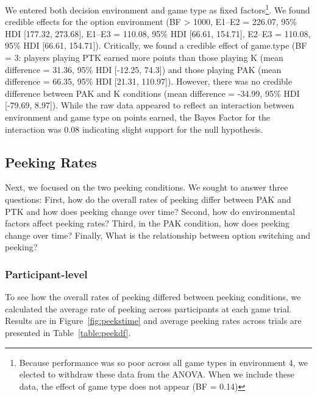 \documentclass[a4paper,doc,natbib,floatsintext]{apa6}\usepackage[]{graphicx}\usepackage[]{color}
\begin{document}
We entered both decision environment and game type as fixed factors\footnote{Because performance was so poor across all game types in environment 4, we elected to withdraw these data from the ANOVA. When we include these data, the effect of game type does not appear (BF = 0.14)}. We found credible effects for the option environment (BF > 1000, E1--E2 = 226.07, 95\% HDI [177.32, 273.68], E1--E3 = 110.08, 95\% HDI [66.61, 154.71], E2--E3 = 110.08, 95\% HDI [66.61, 154.71]). Critically, we found a credible effect of game.type (BF =  3: players playing PTK earned more points than those playing K (mean difference = 31.36, 95\% HDI [-12.25, 74.3]) and those playing PAK (mean difference = 66.35, 95\% HDI [21.31, 110.97]). However, there was no credible difference between PAK and K conditions (mean difference = -34.99, 95\% HDI [-79.69, 8.97]). While the raw data appeared to reflect an interaction between environment and game type on points earned, the Bayes Factor for the interaction was 0.08 indicating slight support for the null hypothesis.

\subsection{Peeking Rates}

Next, we focused on the two peeking conditions. We sought to answer three questions: First, how do the overall rates of peeking differ between PAK and PTK and how does peeking change over time? Second, how do environmental factors affect peeking rates? Third, in the PAK condition, how does peeking change over time? Finally, What is the relationship between option switching and peeking? 

\subsubsection{Participant-level}

To see how the overall rates of peeking differed between peeking conditions, we calculated the average rate of peeking across participants at each game trial. Results are in Figure~\ref{fig:peekstime} and average peeking rates across trials are presented in Table~\ref{table:peekdf}.
\end{document}
